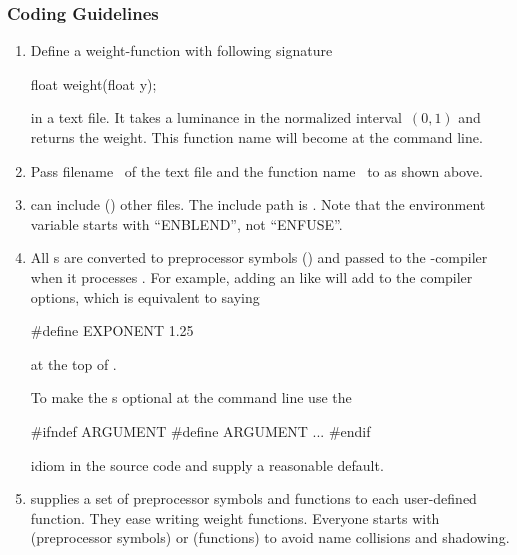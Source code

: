\subsubsection[\acronym{OpenCL} Coding Guidelines]{\label{sec:opencl-coding-guidelines}%
   Coding Guidelines}

\begin{enumerate}
\item
  Define a weight-function with following signature
  \begin{cxxlisting}
float weight(float y);
  \end{cxxlisting}
  in a text file.  It takes a luminance in the normalized interval~$(0, 1)$ and returns the
  weight.  This function name will become  at the \App{} command line.

\item
  Pass filename~ of the text file and the function name~
  to \App{} as shown above.

\item
   can include () other files.  The include path
  is .  Note that the environment variable starts with
  ``ENBLEND'', not ``ENFUSE''.

\item
  All s are converted to preprocessor symbols () and
  passed to the -compiler when it processes .  For
  example, adding an  like  will add
   to the compiler options, which is equivalent to saying
  \begin{cxxlisting}
#define EXPONENT 1.25
  \end{cxxlisting}
  at the top of .

  To make the s optional at the \app{} command line use the
  \begin{cxxlisting}
#ifndef ARGUMENT
#define ARGUMENT ...
#endif
  \end{cxxlisting}
  idiom in the source code and supply a reasonable default.

\item
  \App{} supplies a set of preprocessor symbols and functions to each user-defined function.
  They ease writing weight functions.  Everyone starts with  (preprocessor
  symbols) or  (functions) to avoid name collisions and shadowing.


\end{enumerate}
